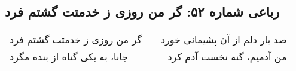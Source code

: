 \begin{center}
\section*{رباعی شماره ۵۲: گر من روزی ز خدمتت گشتم فرد}
\label{sec:052}
\begin{longtable}{l p{0.5cm} r}
گر من روزی ز خدمتت گشتم فرد
&&
صد بار دلم از آن پشیمانی خورد
\\
جانا، به یکی گناه از بنده مگرد
&&
من آدمیم، گنه نخست آدم کرد
\\
\end{longtable}
\end{center}
